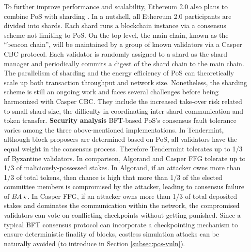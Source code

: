 To further improve performance and scalability, Ethereum 2.0 also plans to combine PoS with sharding . In a nutshell, all Ethereum 2.0 participants are divided into shards. Each shard runs a blockchain instance via a consensus scheme not limiting to PoS. On the top level, the main chain, known as the ``beacon chain'', will be maintained by a group of known validators via a Casper CBC protocol. Each validator is randomly assigned to a shard as the shard manager and periodically commits a digest of the shard chain to the main chain. The parallelism of sharding and the energy efficiency of PoS can theoretically scale up both transaction throughput and network size. Nonetheless, the sharding scheme is still an ongoing work and faces several challenges before being harmonized with Casper CBC. They include the increased take-over risk related to small shard size, the difficulty in coordinating inter-shard communication and token transfer.
\textbf{Security analysis} BFT-based PoS's consensus fault tolerance varies among the three above-mentioned implementations. In Tendermint, although block proposers are determined based on PoS, all validators have the equal weight in the consensus process. Therefore Tendermint tolerates up to 1/3 of Byzantine validators. In comparison, Algorand and Casper FFG tolerate up to 1/3 of maliciously-possessed stakes. In Algorand, if an attacker owns more than 1/3 of total tokens, then chance is high that more than 1/3 of the elected committee members is compromised by the attacker, leading to consensus failure of $BA\star$. In Casper FFG, if an attacker owns more than 1/3 of total deposited stakes and dominates the communication within the network, the compromised validators can vote on conflicting checkpoints without getting punished. Since a typical BFT consensus protocol can incorporate a checkpointing mechanism to ensure deterministic finality of blocks, costless simulation attacks can be naturally avoided (to introduce in Section \ref{subsec:pos-vuln}).

